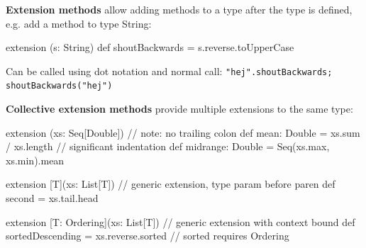 \documentclass[article, a5paper]{memoir}
\newcommand{\LangColor}{scalared}
\newcommand{\head}[1]{{\bfseries {\color{\LangColor}{#1}}\par\vspace{1mm}\hrule\vspace{-2mm}}}
\newcommand{\code}{\lstinline[basicstyle=\ttfamily]}
\newcommand{\Newline}{\vspace{\baselineskip}}
\begin{document}
\vspace*{-2.75em}\head{Extension methods}\Newline
{\small
\textbf{Extension methods} allow adding methods to a type after the type is defined, e.g. add a method to type String:
\vspace*{-0.5em}\begin{Code}
extension (s: String) def shoutBackwards = s.reverse.toUpperCase 
\end{Code} 
\vspace*{-0.45em} Can be called using dot notation and normal call: \code|"hej".shoutBackwards; shoutBackwards("hej")|

\vspace*{0.25em}\textbf{Collective extension methods} provide multiple extensions to the same type:
\vspace*{-0.5em}\begin{Code}
extension (xs: Seq[Double])                       // note: no trailing colon
  def mean: Double = xs.sum / xs.length           // significant indentation
  def midrange: Double = Seq(xs.max, xs.min).mean
\end{Code} 
\vspace*{-0.5em}\begin{Code}
extension [T](xs: List[T])     // generic extension, type param before paren
  def second = xs.tail.head
\end{Code} 
\vspace*{-0.96em}\begin{Code}
extension [T: Ordering](xs: List[T]) // generic extension with context bound
  def sortedDescending = xs.reverse.sorted       // sorted requires Ordering 
\end{Code} 
}
\end{document}

